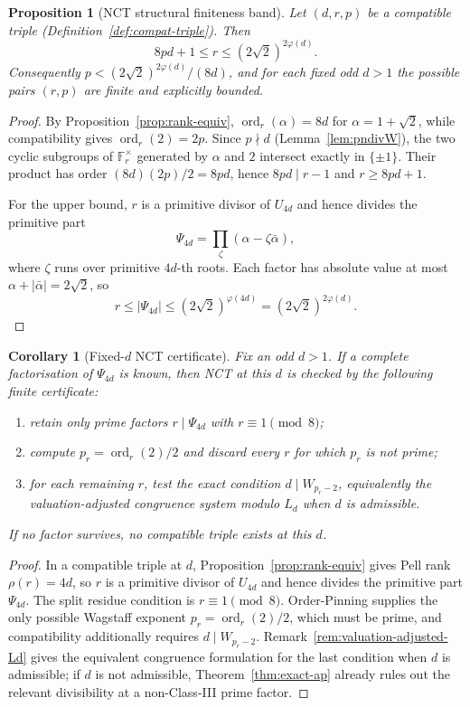 \documentclass[11pt]{amsart}
\theoremstyle{plain}
\newtheorem{proposition}[theorem]{Proposition}
\newtheorem{corollary}[theorem]{Corollary}
\theoremstyle{definition}
\theoremstyle{remark}
\numberwithin{equation}{section}
\newcommand{\ord}{\operatorname{ord}}
\newcommand{\F}{\mathbb{F}}
\begin{document}
\begin{proposition}[NCT structural finiteness band]\label{prop:nct-band}
Let $(d, r, p)$ be a compatible triple (Definition~\ref{def:compat-triple}). Then
\[
  8 p d + 1 \leq r \leq (2\sqrt 2)^{2\varphi(d)}.
\]
Consequently $p < (2\sqrt 2)^{2\varphi(d)}/(8d)$, and for each fixed odd $d>1$ the possible pairs $(r,p)$ are finite and explicitly bounded.
\end{proposition}

\begin{proof}
By Proposition~\ref{prop:rank-equiv}, $\ord_r(\alpha)=8d$ for $\alpha=1+\sqrt2$, while compatibility gives $\ord_r(2)=2p$. Since $p\nmid d$ (Lemma~\ref{lem:pndivW}), the two cyclic subgroups of $\F_r^\times$ generated by $\alpha$ and $2$ intersect exactly in $\{\pm1\}$. Their product has order $(8d)(2p)/2=8pd$, hence $8pd\mid r-1$ and $r\geq 8pd+1$.

For the upper bound, $r$ is a primitive divisor of $U_{4d}$ and hence divides the primitive part
\[
  \Psi_{4d}=\prod_{\zeta}(\alpha-\zeta\bar\alpha),
\]
where $\zeta$ runs over primitive $4d$-th roots. Each factor has absolute value at most $\alpha+|\bar\alpha|=2\sqrt2$, so
\[
  r\leq |\Psi_{4d}|\leq (2\sqrt2)^{\varphi(4d)}=(2\sqrt2)^{2\varphi(d)}.
\]
\end{proof}

\begin{corollary}[Fixed-$d$ NCT certificate]\label{cor:nct-fixed-d-certificate}
Fix an odd $d>1$. If a complete factorisation of $\Psi_{4d}$ is known, then NCT at this $d$ is checked by the following finite certificate:
\begin{enumerate}
\item retain only prime factors $r\mid\Psi_{4d}$ with $r\equiv1\pmod8$;
\item compute $p_r=\ord_r(2)/2$ and discard every $r$ for which $p_r$ is not prime;
\item for each remaining $r$, test the exact condition $d\mid W_{p_r-2}$, equivalently the valuation-adjusted congruence system modulo $L_d$ when $d$ is admissible.
\end{enumerate}
If no factor survives, no compatible triple exists at this $d$.
\end{corollary}

\begin{proof}
In a compatible triple at $d$, Proposition~\ref{prop:rank-equiv} gives Pell rank $\rho(r)=4d$, so $r$ is a primitive divisor of $U_{4d}$ and hence divides the primitive part $\Psi_{4d}$. The split residue condition is $r\equiv1\pmod8$. Order-Pinning supplies the only possible Wagstaff exponent $p_r=\ord_r(2)/2$, which must be prime, and compatibility additionally requires $d\mid W_{p_r-2}$. Remark~\ref{rem:valuation-adjusted-Ld} gives the equivalent congruence formulation for the last condition when $d$ is admissible; if $d$ is not admissible, Theorem~\ref{thm:exact-ap} already rules out the relevant divisibility at a non-Class-III prime factor.
\end{proof}
\end{document}
